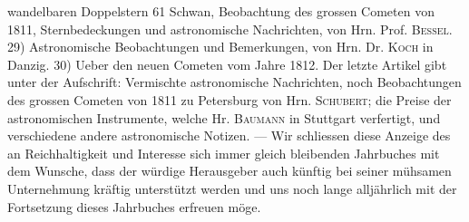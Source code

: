 wandelbaren Doppelstern 61 Schwan, Beobachtung des grossen Cometen von 1811, Sternbedeckungen und astronomische Nachrichten, von Hrn. Prof. \textsc{Bessel}. 29) Astronomische Beobachtungen und Bemerkungen, von Hrn. Dr. \textsc{Koch} in Danzig. 30) Ueber den neuen Cometen vom Jahre 1812. Der letzte Artikel gibt unter der Aufschrift: Vermischte astronomische Nachrichten, noch Beobachtungen des grossen Cometen von 1811 zu Petersburg von Hrn. \textsc{Schubert}; die Preise der astronomischen Instrumente, welche Hr. \textsc{Baumann} in Stuttgart verfertigt, und verschiedene andere astronomische Notizen. --- Wir schliessen diese Anzeige des an Reichhaltigkeit und Interesse sich immer gleich bleibenden Jahrbuches mit dem Wunsche, dass der würdige Herausgeber auch künftig bei seiner mühsamen Unternehmung kräftig unterstützt werden und uns noch lange alljährlich mit der Fortsetzung dieses Jahrbuches erfreuen möge.
